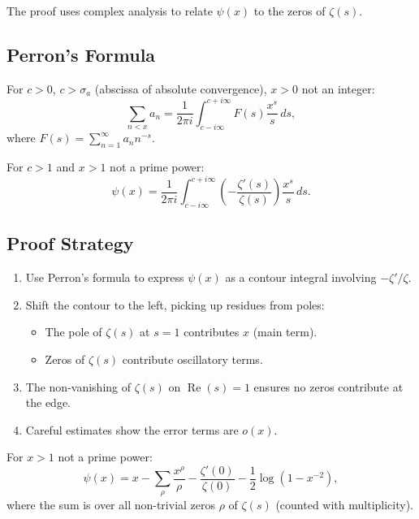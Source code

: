 The proof uses complex analysis to relate $\psi(x)$ to the zeros of $\zeta(s)$.

\subsection{Perron's Formula}

\begin{theorem}
  For $c > 0$, $c > \sigma_a$ (abscissa of absolute convergence), $x > 0$ not an integer:
  \begin{equation}
    \sum_{n < x} a_n = \frac{1}{2\pi i} \int_{c - i\infty}^{c + i\infty} F(s) \frac{x^s}{s} \, ds,
  \end{equation}
  where $F(s) = \sum_{n=1}^{\infty} a_n n^{-s}$.
\end{theorem}

\begin{corollary}
  For $c > 1$ and $x > 1$ not a prime power:
  \begin{equation}
    \psi(x) = \frac{1}{2\pi i} \int_{c-i\infty}^{c+i\infty} \left(-\frac{\zeta'(s)}{\zeta(s)}\right) \frac{x^s}{s} \, ds.
  \end{equation}
\end{corollary}

\subsection{Proof Strategy}

\begin{enumerate}
  \item Use Perron's formula to express $\psi(x)$ as a contour integral involving $-\zeta'/\zeta$.
  \item Shift the contour to the left, picking up residues from poles:
        \begin{itemize}
          \item The pole of $\zeta(s)$ at $s = 1$ contributes $x$ (main term).
          \item Zeros of $\zeta(s)$ contribute oscillatory terms.
        \end{itemize}
  \item The non-vanishing of $\zeta(s)$ on $\operatorname{Re}(s) = 1$ ensures no zeros contribute at the edge.
  \item Careful estimates show the error terms are $o(x)$.
\end{enumerate}

\begin{theorem}
  For $x > 1$ not a prime power:
  \begin{equation}
    \psi(x) = x - \sum_{\rho} \frac{x^{\rho}}{\rho} - \frac{\zeta'(0)}{\zeta(0)} - \frac{1}{2}\log(1 - x^{-2}),
  \end{equation}
  where the sum is over all non-trivial zeros $\rho$ of $\zeta(s)$ (counted with multiplicity).
\end{theorem}

